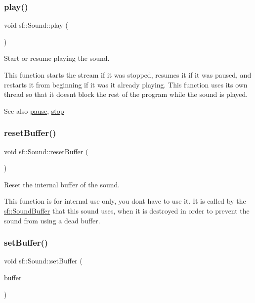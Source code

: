 \subsubsection{\texorpdfstring{play()}{play()}}
{\footnotesize\ttfamily void sf\+::\+Sound\+::play (\begin{DoxyParamCaption}{ }\end{DoxyParamCaption})}



Start or resume playing the sound. 

This function starts the stream if it was stopped, resumes it if it was paused, and restarts it from beginning if it was it already playing. This function uses its own thread so that it doesn\textquotesingle{}t block the rest of the program while the sound is played.

\begin{DoxySeeAlso}{See also}
\hyperlink{classsf_1_1_sound_a5eeb25815bfa8cdc4a6cc000b7b19ad5}{pause}, \hyperlink{classsf_1_1_sound_aa9c91c34f7c6d344d5ee9b997511f754}{stop} 
\end{DoxySeeAlso}
\mbox{\label{classsf_1_1_sound_acb7289d45e06fb76b8292ac84beb82a7}} 
\subsubsection{\texorpdfstring{reset\+Buffer()}{resetBuffer()}}
{\footnotesize\ttfamily void sf\+::\+Sound\+::reset\+Buffer (\begin{DoxyParamCaption}{ }\end{DoxyParamCaption})}



Reset the internal buffer of the sound. 

This function is for internal use only, you don\textquotesingle{}t have to use it. It is called by the \hyperlink{classsf_1_1_sound_buffer}{sf\+::\+Sound\+Buffer} that this sound uses, when it is destroyed in order to prevent the sound from using a dead buffer. \mbox{\label{classsf_1_1_sound_a8b395e9713d0efa48a18628c8ec1972e}} 
\subsubsection{\texorpdfstring{set\+Buffer()}{setBuffer()}}
{\footnotesize\ttfamily void sf\+::\+Sound\+::set\+Buffer (\begin{DoxyParamCaption}\item[{const \hyperlink{classsf_1_1_sound_buffer}{Sound\+Buffer} \&}]{buffer }\end{DoxyParamCaption})}



